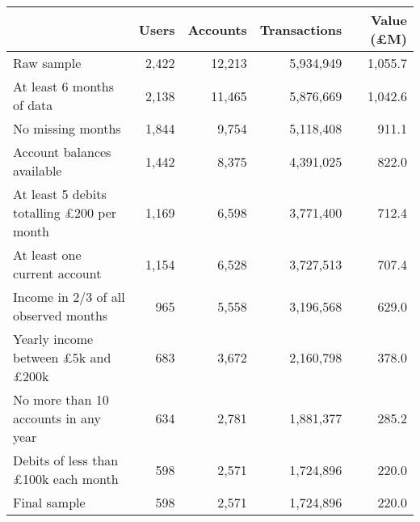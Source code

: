 \begin{tabular}{lrrrr}
\toprule
                                                 & Users & Accounts & Transactions & Value (\pounds M) \\
\midrule
                                      Raw sample & 2,422 &   12,213 &    5,934,949 &           1,055.7 \\
                       At least 6 months of data & 2,138 &   11,465 &    5,876,669 &           1,042.6 \\
                               No missing months & 1,844 &    9,754 &    5,118,408 &             911.1 \\
                      Account balances available & 1,442 &    8,375 &    4,391,025 &             822.0 \\
At least 5 debits totalling \pounds200 per month & 1,169 &    6,598 &    3,771,400 &             712.4 \\
                    At least one current account & 1,154 &    6,528 &    3,727,513 &             707.4 \\
            Income in 2/3 of all observed months &   965 &    5,558 &    3,196,568 &             629.0 \\
 Yearly income between \pounds5k and \pounds200k &   683 &    3,672 &    2,160,798 &             378.0 \\
            No more than 10 accounts in any year &   634 &    2,781 &    1,881,377 &             285.2 \\
      Debits of less than \pounds100k each month &   598 &    2,571 &    1,724,896 &             220.0 \\
                                    Final sample &   598 &    2,571 &    1,724,896 &             220.0 \\
\bottomrule
\end{tabular}
